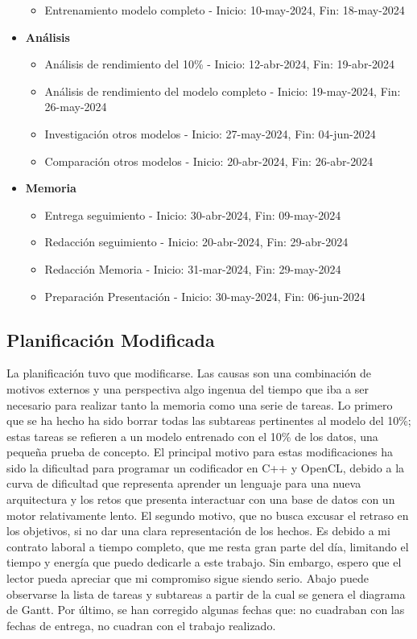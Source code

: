 \begin{itemize}
\begin{itemize}
        \item Entrenamiento modelo completo - Inicio: 10-may-2024, Fin: 18-may-2024
    \end{itemize}
    \item \textbf{Análisis}
    \begin{itemize}
        \item Análisis de rendimiento del 10\% - Inicio: 12-abr-2024, Fin: 19-abr-2024
        \item Análisis de rendimiento del modelo completo - Inicio: 19-may-2024, Fin: 26-may-2024
        \item Investigación otros modelos - Inicio: 27-may-2024, Fin: 04-jun-2024
        \item Comparación otros modelos - Inicio: 20-abr-2024, Fin: 26-abr-2024
    \end{itemize}
    \item \textbf{Memoria}
    \begin{itemize}
        \item Entrega seguimiento - Inicio: 30-abr-2024, Fin: 09-may-2024
        \item Redacción seguimiento - Inicio: 20-abr-2024, Fin: 29-abr-2024
        \item Redacción Memoria - Inicio: 31-mar-2024, Fin: 29-may-2024
        \item Preparación Presentación - Inicio: 30-may-2024, Fin: 06-jun-2024
    \end{itemize}
\end{itemize}

\subsection{Planificación Modificada}
La planificación tuvo que modificarse. Las causas son una combinación de motivos externos y una perspectiva algo ingenua del tiempo que iba a ser necesario para realizar tanto la memoria como una serie de tareas.
Lo primero que se ha hecho ha sido borrar todas las subtareas pertinentes al modelo del 10\%; estas tareas se refieren a un modelo entrenado con el 10\% de los datos, una pequeña prueba de concepto.
El principal motivo para estas modificaciones ha sido la dificultad para programar un codificador en C++ y OpenCL, debido a la curva de dificultad que representa aprender un lenguaje para una nueva arquitectura y los retos que presenta interactuar con una base de datos con un motor relativamente lento.
El segundo motivo, que no busca excusar el retraso en los objetivos, si no dar una clara representación de los hechos. Es debido a mi contrato laboral a tiempo completo, que me resta gran parte del día, limitando el tiempo y energía que puedo dedicarle a este trabajo. 
Sin embargo, espero que el lector pueda apreciar que mi compromiso sigue siendo serio. Abajo puede observarse la lista de tareas y subtareas a partir de la cual se genera el diagrama de Gantt.
Por último, se han corregido algunas fechas que: no cuadraban con las fechas de entrega, no cuadran con el trabajo realizado.

